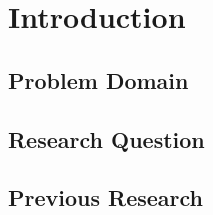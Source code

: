 \section{Introduction}

\subsection{Problem Domain}

\subsection{Research Question}

\subsection{Previous Research}